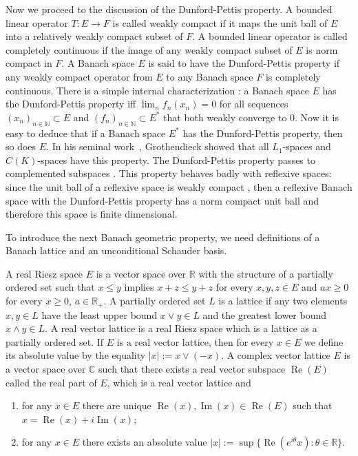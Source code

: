 Now we proceed to the discussion of the Dunford-Pettis property. A bounded
linear operator $T:E\to F$ is called weakly compact if it maps the unit ball of
$E$ into a relatively weakly compact subset of $F$. A bounded linear operator is
called completely continuous if the image of any weakly compact subset of $E$ is
norm compact in $F$. A Banach space $E$ is said to have the Dunford-Pettis
property if any weakly compact operator from $E$ to any Banach space $F$ is
completely continuous. There is a simple internal characterization
\cite[theorem 5.4.4]{KalAlbTopicsBanSpTh}: a Banach space $E$ has the
Dunford-Pettis property iff $\lim_n f_n(x_n)=0$ for all sequences
${(x_n)}_{n\in\mathbb{N}}\subset E$ and ${(f_n)}_{n\in\mathbb{N}}\subset E^*$ 
that both weakly converge to $0$. Now it is easy to deduce 
that if a Banach space $E^*$ has the Dunford-Pettis property, then so does $E$.
In his seminal work~\cite{GrothApllFaiblCompSpCK}, Grothendieck showed that all
$L_1$-spaces and $C(K)$-spaces have this property. The Dunford-Pettis property
passes to complemented subspaces \cite[proposition 13.44]{FabHabBanSpTh}. This
property behaves badly with reflexive spaces: since the unit ball of a reflexive
space is weakly compact \cite[theorem 2.8.2]{MeggIntroBanSpTh}, then a reflexive
Banach space with the Dunford-Pettis property has a norm compact unit ball and
therefore this space is finite dimensional. 

To introduce the next Banach geometric property, we need definitions of a Banach
lattice and an unconditional Schauder basis. 

A real Riesz space $E$ is a vector space over $\mathbb{R}$ with the structure of
a partially ordered set such that $x\leq y$ implies $x+z\leq y+z$ for every
$x,y,z\in E$ and $ax\geq 0$ for every $x\geq 0$, $a\in\mathbb{R}_+$. A partially
ordered set $L$ is a lattice if any two elements $x,y\in L$ have the least upper bound
$x\vee y\in L$ and the greatest lower bound $x\wedge y\in L$. A real vector lattice is
a real Riesz space which is a lattice as a partially ordered set. If $E$ is a real
vector lattice, then for every $x\in E$ we define its absolute value by the equality
$|x|:=x\vee(-x)$. A complex vector lattice $E$ is a vector space over
$\mathbb{C}$ such that there exists a real vector subspace
$\operatorname{Re}(E)$ called the real part of $E$, which is a real vector lattice and
\begin{enumerate}[label = (\roman*)]
  \item for any $x\in E$ there are unique
  $\operatorname{Re}(x),\operatorname{Im}(x)\in \operatorname{Re}(E)$ such that
  $x=\operatorname{Re}(x)+i\operatorname{Im}(x)$;

  \item for any $x\in E$ there exists an absolute value $|x|:=\sup
  \{\operatorname{Re}(e^{i\theta}x):\theta\in\mathbb{R} \}$.
\end{enumerate}

